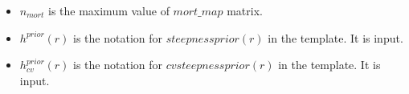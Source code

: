 \documentclass{article}
\begin{document}
\begin{itemize}
    \item $n_{mort}$ is the maximum value of $mort\_map$ matrix. 
    \item $h^{prior}(r)$ is the notation for $steepnessprior(r)$ in the template. It is input.
    \item $h^{prior}_{cv}(r)$ is the notation for $cvsteepnessprior(r)$ in the template. It is input.


\end{itemize}
\end{document}
